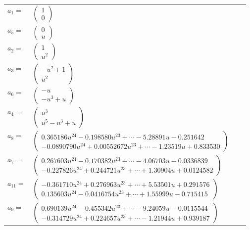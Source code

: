 \documentclass[1p]{elsarticle_modified}
\theoremstyle{definition}
\begin{document}
\begin{tabular}{m{7pt} m{180pt} m{7pt} m{180pt} }
\flushright $a_{1}=$&$\begin{pmatrix}1\\0\end{pmatrix}$ \\
\flushright $a_{5}=$&$\begin{pmatrix}0\\u\end{pmatrix}$ \\
\flushright $a_{2}=$&$\begin{pmatrix}1\\u^2\end{pmatrix}$ \\
\flushright $a_{3}=$&$\begin{pmatrix}- u^2+1\\u^2\end{pmatrix}$ \\
\flushright $a_{6}=$&$\begin{pmatrix}- u\\- u^3+u\end{pmatrix}$ \\
\flushright $a_{4}=$&$\begin{pmatrix}u^3\\u^5- u^3+u\end{pmatrix}$ \\
\flushright $a_{8}=$&$\begin{pmatrix}0.365186 u^{24}-0.198580 u^{23}+\cdots-5.28891 u-0.251642\\-0.0890790 u^{24}+0.00552672 u^{23}+\cdots-1.23519 u+0.833530\end{pmatrix}$ \\
\flushright $a_{7}=$&$\begin{pmatrix}0.267603 u^{24}-0.170382 u^{23}+\cdots-4.06703 u-0.0336839\\-0.227826 u^{24}+0.244721 u^{23}+\cdots+1.30904 u+0.0124582\end{pmatrix}$ \\
\flushright $a_{11}=$&$\begin{pmatrix}-0.361710 u^{24}+0.276963 u^{23}+\cdots+5.53501 u+0.291576\\0.135603 u^{24}-0.0416754 u^{23}+\cdots+1.55999 u-0.715415\end{pmatrix}$ \\
\flushright $a_{9}=$&$\begin{pmatrix}0.690139 u^{24}-0.455342 u^{23}+\cdots-9.24059 u-0.0115544\\-0.314729 u^{24}+0.224657 u^{23}+\cdots-1.21944 u+0.939187\end{pmatrix}$ \\

\end{tabular}
\end{document}
